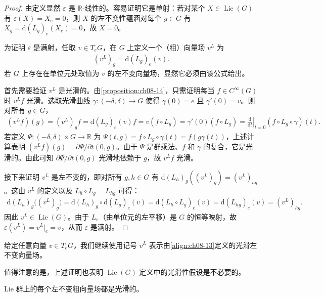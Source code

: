 \documentclass[../../main.tex]{subfiles}
\begin{document}
\begin{proof}
由定义显然 $\varepsilon$ 是 $\mathbb{R}$-线性的。容易证明它是单射：若对某个 $X\in\operatorname{Lie}(G)$ 有 $\varepsilon(X)=X_e=0$，则 $X$ 的左不变性蕴涵对每个 $g\in G$ 有 $X_g=\mathrm{d}(L_g)_e(X_e)=0$，故 $X=0$。

为证明 $\varepsilon$ 是满射，任取 $v\in T_eG$，在 $G$ 上定义一个（粗）向量场 $v^L$ 为
\begin{align}
(v^L)_g=\mathrm{d}(L_g)_e(v).\label{align:ch08-13}
\end{align}
若 $G$ 上存在在单位元处取值为 $v$ 的左不变向量场，显然它必须由该公式给出。

首先需要验证 $v^L$ 是光滑的。由\cref{proposition:ch08-14}，只需证明每当 $f\in C^\infty(G)$ 时 $v^Lf$ 光滑。选取光滑曲线 $\gamma\colon(-\delta,\delta)\to G$ 使得 $\gamma(0)=e$ 且 $\gamma'(0)=v$。则对所有 $g\in G$，
\begin{align*}
(v^Lf)(g)=(v^L)_gf=\mathrm{d}(L_g)_e(v)f=v(f\circ L_g)=\gamma'(0)(f\circ L_g)=\left.\frac{\mathrm{d}}{\mathrm{d}t}\right|_{t=0}(f\circ L_g\circ\gamma)(t).
\end{align*}
若定义 $\Psi\colon(-\delta,\delta)\times G\to\mathbb{R}$ 为 $\Psi(t,g)=f\circ L_g\circ\gamma(t)=f(g\gamma(t))$，上述计算表明 $(v^Lf)(g)=\partial\Psi/\partial t(0,g)$。由于 $\Psi$ 是群乘法、$f$ 和 $\gamma$ 的复合，它是光滑的。由此可知 $\partial\Psi/\partial t(0,g)$ 光滑地依赖于 $g$，故 $v^Lf$ 光滑。

接下来证明 $v^L$ 是左不变的，即对所有 $g,h\in G$ 有 $\mathrm{d}(L_h)_g((v^L)_g)=(v^L)_{hg}$。这由 $v^L$ 的定义以及 $L_h\circ L_g=L_{hg}$ 可得：
\begin{align*}
\mathrm{d}(L_h)_g\bigl((v^L)_g\bigr)=\mathrm{d}(L_h)_g\circ\mathrm{d}(L_g)_e(v)=\mathrm{d}(L_h\circ L_g)_e(v)=\mathrm{d}(L_{hg})_e(v)=(v^L)_{hg}.
\end{align*}
因此 $v^L\in\operatorname{Lie}(G)$。由于 $L_e$（由单位元的左平移）是 $G$ 的恒等映射，故 $\varepsilon(v^L)=v^L|_e=v$，从而 $\varepsilon$ 是满射。
\end{proof}

给定任意向量 $v\in T_eG$，我们继续使用记号 $v^L$ 表示由\eqref{align:ch08-13}定义的光滑左不变向量场。

值得注意的是，上述证明也表明 $\operatorname{Lie}(G)$ 定义中的光滑性假设是不必要的。

\begin{corollary}\label{corollary:ch08-38}
Lie 群上的每个左不变粗向量场都是光滑的。
\end{corollary}
\end{document}
